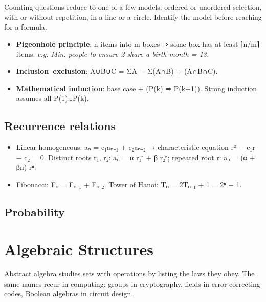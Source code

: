 Counting questions reduce to one of a few models: ordered or unordered selection, with or without
repetition, in a line or a circle. Identify the model before reaching for a formula.



\begin{itemize}
\tightlist
\item
  \textbf{Pigeonhole principle}: n items into m boxes ⇒ some box has at least ⌈n/m⌉ items.
  \emph{e.g. Min. people to ensure 2 share a birth month = 13.}
\item
  \textbf{Inclusion--exclusion}: \textbar A∪B∪C\textbar{} = ΣA − Σ(A∩B) + (A∩B∩C).
\item
  \textbf{Mathematical induction}: base case + (P(k) ⇒ P(k+1)). Strong induction assumes all P(1)\ldots P(k).
\end{itemize}

\needspace{95pt}

\hypertarget{p2-01--recurrence-relations}{%
\subsection{Recurrence relations}\label{p2-01--recurrence-relations}}

\begin{itemize}
\tightlist
\item
  Linear homogeneous: aₙ = c₁aₙ₋₁ + c₂aₙ₋₂ → characteristic equation r² − c₁r − c₂ = 0.
  Distinct roots r₁, r₂: aₙ = α r₁ⁿ + β r₂ⁿ; repeated root r: aₙ = (α + βn) rⁿ.
\item
  Fibonacci: Fₙ = Fₙ₋₁ + Fₙ₋₂. Tower of Hanoi: Tₙ = 2Tₙ₋₁ + 1 = 2ⁿ − 1.
\end{itemize}

\needspace{95pt}

\hypertarget{p2-01--probability}{%
\subsection{Probability}\label{p2-01--probability}}



\needspace{125pt}

\hypertarget{p2-01--4-algebraic-structures}{%
\section{Algebraic Structures}\label{p2-01--4-algebraic-structures}}

Abstract algebra studies sets with operations by listing the laws they obey. The same names recur in
computing: groups in cryptography, fields in error-correcting codes, Boolean algebras in circuit design.

